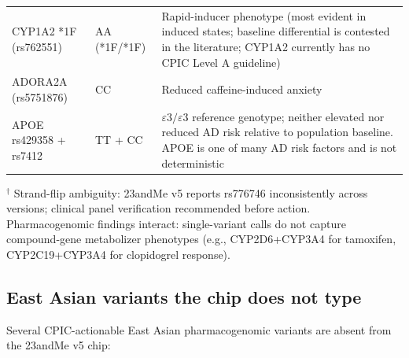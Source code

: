 \documentclass[11pt,a4paper]{article}
\begin{document}
\begin{center}
\begin{tabular}{p{}p{}p{}}
CYP1A2 *1F (rs762551) & AA (*1F/*1F) & Rapid-inducer phenotype (most evident in induced states; baseline differential is contested in the literature; CYP1A2 currently has no CPIC Level A guideline) \\
ADORA2A (rs5751876) & CC             & Reduced caffeine-induced anxiety \\
APOE rs429358 + rs7412 & TT + CC     & $\varepsilon 3 / \varepsilon 3$ reference genotype; neither elevated nor reduced AD risk relative to population baseline. APOE is one of many AD risk factors and is not deterministic \\
\bottomrule
\end{tabular}
\end{center}

{\footnotesize $^\dagger$ Strand-flip ambiguity: 23andMe v5 reports rs776746 inconsistently across versions; clinical panel verification recommended before action. \\
Pharmacogenomic findings interact: single-variant calls do not capture compound-gene metabolizer phenotypes (e.g., CYP2D6+CYP3A4 for tamoxifen, CYP2C19+CYP3A4 for clopidogrel response).}

\subsection{East Asian variants the chip does not type}

Several CPIC-actionable East Asian pharmacogenomic variants are absent from the 23andMe v5 chip:
\end{document}

